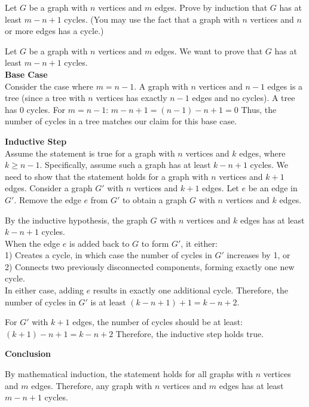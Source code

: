 \documentclass[solution,letterpaper]{cs20}
\begin{document}
    \begin{problem}
        Let $G$ be a graph with $n$ vertices and $m$ edges. Prove by induction that $G$ has at least
        $m- n + 1$ cycles.  (You may use the fact that a graph with $n$ vertices and $n$ or more edges
        has a cycle.)

        \begin{solution}

            Let \( G \) be a graph with \( n \) vertices and \( m \) edges. We want to prove that \( G \) has at least \( m - n + 1 \) cycles.\\
            \textbf{Base Case} \\
            Consider the case where \( m = n - 1 \).
            A graph with \( n \) vertices and \( n - 1 \) edges is a tree (since a tree with \( n \) vertices has exactly \( n - 1 \) edges and no cycles). A tree has 0 cycles.
            For \( m = n - 1 \): $m - n + 1 = (n - 1) - n + 1 = 0$
            Thus, the number of cycles in a tree matches our claim for this base case.

            \textbf{Inductive Step} \\
            Assume the statement is true for a graph with \( n \) vertices and \( k \) edges, where \( k \geq n - 1 \). Specifically, assume such a graph has at least \( k - n + 1 \) cycles.
            We need to show that the statement holds for a graph with \( n \) vertices and \( k + 1 \) edges.
            Consider a graph \( G' \) with \( n \) vertices and \( k + 1 \) edges. Let \( e \) be an edge in \( G' \). Remove the edge \( e \) from \( G' \) to obtain a graph \( G \) with \( n \) vertices and \( k \) edges.

            By the inductive hypothesis, the graph \( G \) with \( n \) vertices and \( k \) edges has at least \( k - n + 1 \) cycles. \\ When the edge \( e \) is added back to \( G \) to form \( G' \), it either: \\

            1) Creates a cycle, in which case the number of cycles in \( G' \) increases by 1, or \\
            2) Connects two previously disconnected components, forming exactly one new cycle. \\

            In either case, adding \( e \) results in exactly one additional cycle. Therefore, the number of cycles in \( G' \) is at least \( (k - n + 1) + 1 = k - n + 2 \).

            For \( G' \) with \( k + 1 \) edges, the number of cycles should be at least: $(k + 1) - n + 1 = k - n + 2$
            Therefore, the inductive step holds true.

            \textbf{Conclusion}

            By mathematical induction, the statement holds for all graphs with \( n \) vertices and \( m \) edges. Therefore, any graph with \( n \) vertices and \( m \) edges has at least \( m - n + 1 \) cycles.

        \end{solution}
    \end{problem}
    \newpage
\end{document}
